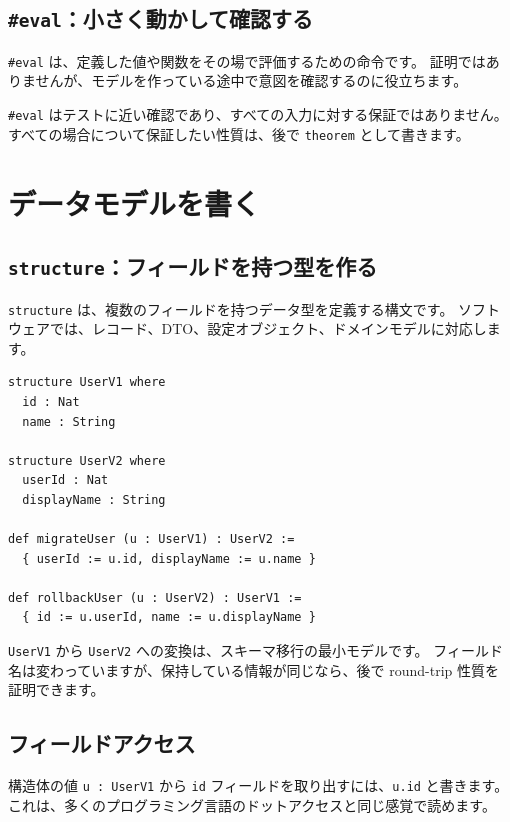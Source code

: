 \subsection{\texttt{\#eval}：小さく動かして確認する}

\texttt{\#eval} は、定義した値や関数をその場で評価するための命令です。
証明ではありませんが、モデルを作っている途中で意図を確認するのに役立ちます。

\texttt{\#eval} はテストに近い確認であり、すべての入力に対する保証ではありません。
すべての場合について保証したい性質は、後で \texttt{theorem} として書きます。

\section{データモデルを書く}

\subsection{\texttt{structure}：フィールドを持つ型を作る}

\texttt{structure} は、複数のフィールドを持つデータ型を定義する構文です。
ソフトウェアでは、レコード、DTO、設定オブジェクト、ドメインモデルに対応します。

\begin{listing}[htbp]
\begin{verbatim}
structure UserV1 where
  id : Nat
  name : String

structure UserV2 where
  userId : Nat
  displayName : String

def migrateUser (u : UserV1) : UserV2 :=
  { userId := u.id, displayName := u.name }

def rollbackUser (u : UserV2) : UserV1 :=
  { id := u.userId, name := u.displayName }
\end{verbatim}
\caption{\texttt{UserV1}・\texttt{UserV2}・\texttt{migrateUser}・\texttt{rollbackUser}}
\label{lst:appA_structure}
\end{listing}

\texttt{UserV1} から \texttt{UserV2} への変換は、スキーマ移行の最小モデルです。
フィールド名は変わっていますが、保持している情報が同じなら、後で round-trip 性質を証明できます。

\subsection{フィールドアクセス}

構造体の値 \texttt{u : UserV1} から \texttt{id} フィールドを取り出すには、\texttt{u.id} と書きます。
これは、多くのプログラミング言語のドットアクセスと同じ感覚で読めます。

